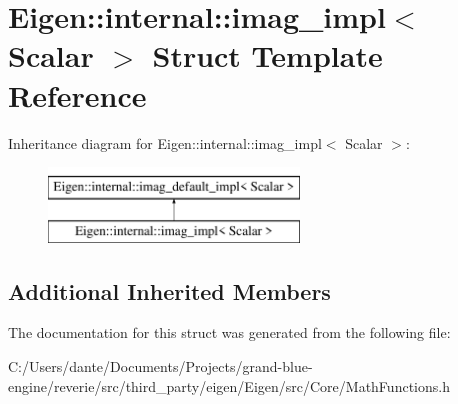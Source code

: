 \hypertarget{struct_eigen_1_1internal_1_1imag__impl}{}\section{Eigen\+::internal\+::imag\+\_\+impl$<$ Scalar $>$ Struct Template Reference}
\label{struct_eigen_1_1internal_1_1imag__impl}
Inheritance diagram for Eigen\+::internal\+::imag\+\_\+impl$<$ Scalar $>$\+:\begin{figure}[H]
\begin{center}
\leavevmode
\includegraphics[height=2.000000cm]{struct_eigen_1_1internal_1_1imag__impl}
\end{center}
\end{figure}
\subsection*{Additional Inherited Members}


The documentation for this struct was generated from the following file\+:\begin{DoxyCompactItemize}
\item 
C\+:/\+Users/dante/\+Documents/\+Projects/grand-\/blue-\/engine/reverie/src/third\+\_\+party/eigen/\+Eigen/src/\+Core/Math\+Functions.\+h\end{DoxyCompactItemize}
